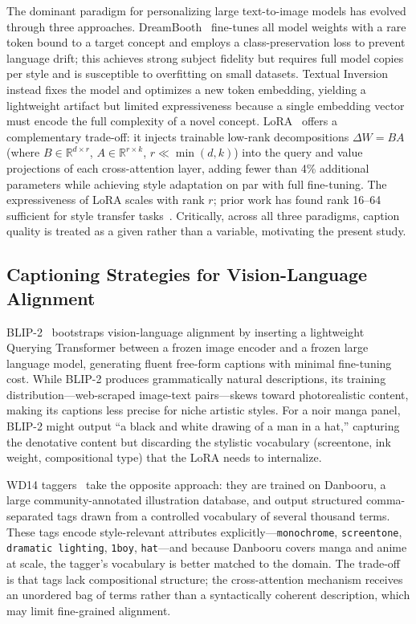 \documentclass[10pt,twocolumn,letterpaper]{article}
\begin{document}
The dominant paradigm for personalizing large text-to-image models has evolved through three approaches.
DreamBooth~\cite{ruiz2023dreambooth} fine-tunes all model weights with a rare token bound to a target concept and employs a class-preservation loss to prevent language drift; this achieves strong subject fidelity but requires full model copies per style and is susceptible to overfitting on small datasets.
Textual Inversion~\cite{gal2022textual} instead fixes the model and optimizes a new token embedding, yielding a lightweight artifact but limited expressiveness because a single embedding vector must encode the full complexity of a novel concept.
LoRA~\cite{hu2021lora} offers a complementary trade-off: it injects trainable low-rank decompositions $\Delta W = BA$ (where $B \in \mathbb{R}^{d \times r}$, $A \in \mathbb{R}^{r \times k}$, $r \ll \min(d,k)$) into the query and value projections of each cross-attention layer, adding fewer than 4\% additional parameters while achieving style adaptation on par with full fine-tuning.
The expressiveness of LoRA scales with rank $r$; prior work has found rank 16–64 sufficient for style transfer tasks~\cite{hu2021lora}.
Critically, across all three paradigms, caption quality is treated as a given rather than a variable, motivating the present study.

\subsection{Captioning Strategies for Vision-Language Alignment}

BLIP-2~\cite{li2023blip2} bootstraps vision-language alignment by inserting a lightweight Querying Transformer between a frozen image encoder and a frozen large language model, generating fluent free-form captions with minimal fine-tuning cost.
While BLIP-2 produces grammatically natural descriptions, its training distribution—web-scraped image-text pairs—skews toward photorealistic content, making its captions less precise for niche artistic styles.
For a noir manga panel, BLIP-2 might output ``a black and white drawing of a man in a hat,'' capturing the denotative content but discarding the stylistic vocabulary (screentone, ink weight, compositional type) that the LoRA needs to internalize.

WD14 taggers~\cite{radford2021clip} take the opposite approach: they are trained on Danbooru, a large community-annotated illustration database, and output structured comma-separated tags drawn from a controlled vocabulary of several thousand terms.
These tags encode style-relevant attributes explicitly—\texttt{monochrome}, \texttt{screentone}, \texttt{dramatic lighting}, \texttt{1boy}, \texttt{hat}—and because Danbooru covers manga and anime at scale, the tagger's vocabulary is better matched to the domain.
The trade-off is that tags lack compositional structure; the cross-attention mechanism receives an unordered bag of terms rather than a syntactically coherent description, which may limit fine-grained alignment.
\end{document}

